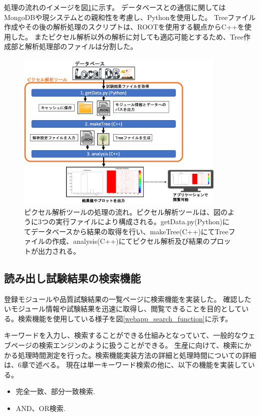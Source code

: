 処理の流れのイメージを図\ref{analysis_tool_flow}に示す。
データベースとの通信に関してはMongoDBや現システムとの親和性を考慮し、Pythonを使用した。
Treeファイル作成やその後の解析処理のスクリプトは、ROOTを使用する観点からC++を使用した。
またピクセル解析以外の解析に対しても適応可能とするため、Tree作成部と解析処理部のファイルは分割した。

\begin{figure}[bpt]\centering
\includegraphics[width=10cm]{./analysis_tool_flow.png}
\caption[ピクセル解析ツールの処理の流れ]{ピクセル解析ツールの処理の流れ。ピクセル解析ツールは、図のように3つの実行ファイルにより構成される。getData.py(Python)にてデータベースから結果の取得を行い、makeTree(C++)にてTreeファイルの作成、analysis(C++)にてピクセル解析及び結果のプロットが出力される。}
\label{analysis_tool_flow}
\end{figure}

\clearpage
\subsection{読み出し試験結果の検索機能}
登録モジュールや品質試験結果の一覧ページに検索機能を実装した。
確認したいモジュール情報や試験結果を迅速に取得し、閲覧できることを目的としている。検索機能を使用している様子を図\ref{webapp_search_function}に示す。

キーワードを入力し、検索することができる仕組みとなっていて、一般的なウェブページの検索エンジンのように扱うことができる。
生産に向けて、検索にかかる処理時間測定を行った。検索機能実装方法の詳細と処理時間についての詳細は、6章で述べる。
現在は単一キーワード検索の他に、以下の機能を実装している。
\begin{itemize}
  \item 完全一致、部分一致検索.
  \item AND、OR検索.
\end{itemize}

